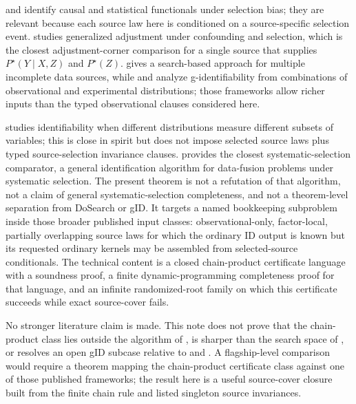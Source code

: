 \documentclass[11pt]{article}
\theoremstyle{definition}
\theoremstyle{plain}
\theoremstyle{remark}
\begin{document}
\cite{BareinboimTianPearl2014Selection} and
\cite{CorreaTianBareinboim2019SelectionEffects} identify causal and
statistical functionals under selection bias; they are relevant because each
source law here is conditioned on a source-specific selection event.
\cite{CorreaTianBareinboim2018Adjustment} studies generalized adjustment
under confounding and selection, which is the closest adjustment-corner
comparison for a single source that supplies \(P^\star(Y\mid X,Z)\) and
\(P^\star(Z)\).  \cite{TikkaHyttinenKarvanen2021DoSearch} gives a
search-based approach for multiple incomplete data sources, while
\cite{LeeCorreaBareinboim2020GID} and
\cite{KivvaMokhtarianEtesamiKiyavash2022RevisitGID} analyze
g-identifiability from combinations of observational and experimental
distributions; those frameworks allow richer inputs than the typed
observational clauses considered here.

\cite{LeeBareinboim2020PartialObservability} studies identifiability when
different distributions measure different subsets of variables; this is close
in spirit but does not impose selected source laws plus typed source-selection
invariance clauses.  \cite{LeeGhassamiShpitser2024DataFusionSelection}
provides the closest systematic-selection comparator, a general identification
algorithm for data-fusion problems under systematic selection.  The present
theorem is not a refutation of that algorithm, not a claim of general
systematic-selection completeness, and not a theorem-level separation from
DoSearch or gID.  It targets a named bookkeeping subproblem inside those
broader published input classes: observational-only, factor-local, partially
overlapping source laws for which the ordinary ID output is known but its
requested ordinary kernels may be assembled from selected-source
conditionals.  The technical content is a closed chain-product certificate
language with a soundness proof, a finite dynamic-programming completeness
proof for that language, and an infinite randomized-root family on which this
certificate succeeds while exact source-cover fails.

No stronger literature claim is made.  This note does not prove that the
chain-product class lies outside the algorithm of
\cite{LeeGhassamiShpitser2024DataFusionSelection}, is sharper than the
search space of \cite{TikkaHyttinenKarvanen2021DoSearch}, or resolves an open
gID subcase relative to \cite{LeeCorreaBareinboim2020GID} and
\cite{KivvaMokhtarianEtesamiKiyavash2022RevisitGID}.  A flagship-level
comparison would require a theorem mapping the chain-product certificate
class against one of those published frameworks; the result here is a useful
source-cover closure built from the finite chain rule and listed singleton
source invariances.
\end{document}
